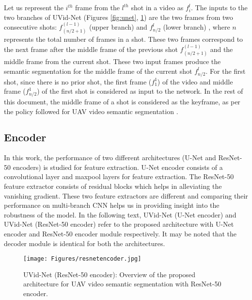 \documentclass[journal]{IEEEtran}
\begin{document}
\par Let us represent the $i^{th}$ frame from the $l^{th}$ shot in a video as $f_i^l$. The inputs to the two branches of UVid-Net (Figures \ref{fig:unet}, \ref{fig:res}) are the two frames from two consecutive shots: $f_{(n/2+1)}^{(l-1)}$ (upper branch) and $f_{n/2}^l$ (lower branch) , where $n$ represents the total number of frames in a shot. These two frames correspond to the next frame after the middle frame of the previous shot  $f_{(n/2+1)}^{(l-1)}$ and the middle frame from the current shot. These two input frames produce the semantic segmentation for the middle frame of the current shot   $f_{n/2}^l$. For the first shot, since there is no prior shot, the first frame ($f_1^1$) of the video and middle frame ($f_{n/2}^1$) of the first shot is considered as input to  the network.
In the rest of this document, the middle frame of a shot is considered as the keyframe, as per the policy followed for UAV video semantic segmentation \cite{19}.





\subsection{Encoder}  
\label{SubSec:Encoder}
\par  In this work, the performance of two different architectures (U-Net and ResNet-50 encoders) is studied for feature extraction. U-Net encoder consists of a convolutional layer and maxpool layers for feature extraction. The ResNet-50 feature extractor consists of residual blocks which helps in alleviating the vanishing gradient. These two feature extractors are different and comparing their performance on multi-branch CNN helps us in providing insight into the robustness of the model. In the following text, UVid-Net (U-Net encoder) and UVid-Net (ResNet-50 encoder) refer to the proposed architecture with U-Net encoder and ResNet-50 encoder module respectively. It may be noted that the decoder module is identical for both the architectures. 


\begin{figure}[t]
	\begin{center}
		\texttt{[image: Figures/resnetencoder.jpg]}
\end{center}
	\caption{UVid-Net (ResNet-50 encoder): Overview of the proposed architecture for UAV video semantic segmentation with ResNet-50 encoder.}
	\label{fig:res}
\end{figure} 
\end{document}
